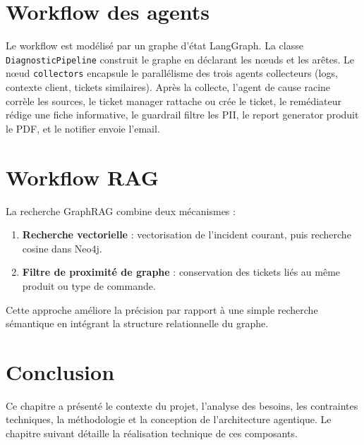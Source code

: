 \section{Workflow des agents}
Le workflow est modélisé par un graphe d'état LangGraph. La classe \texttt{DiagnosticPipeline} construit le graphe en déclarant les nœuds et les arêtes. Le nœud \texttt{collectors} encapsule le parallélisme des trois agents collecteurs (logs, contexte client, tickets similaires). Après la collecte, l'agent de cause racine corrèle les sources, le ticket manager rattache ou crée le ticket, le remédiateur rédige une fiche informative, le guardrail filtre les PII, le report generator produit le PDF, et le notifier envoie l'email.

\section{Workflow RAG}
La recherche GraphRAG combine deux mécanismes :

\begin{enumerate}
    \item \textbf{Recherche vectorielle} : vectorisation de l'incident courant, puis recherche cosine dans Neo4j.
    \item \textbf{Filtre de proximité de graphe} : conservation des tickets liés au même produit ou type de commande.
\end{enumerate}

Cette approche améliore la précision par rapport à une simple recherche sémantique en intégrant la structure relationnelle du graphe.

\section*{Conclusion}
Ce chapitre a présenté le contexte du projet, l'analyse des besoins, les contraintes techniques, la méthodologie et la conception de l'architecture agentique. Le chapitre suivant détaille la réalisation technique de ces composants.

